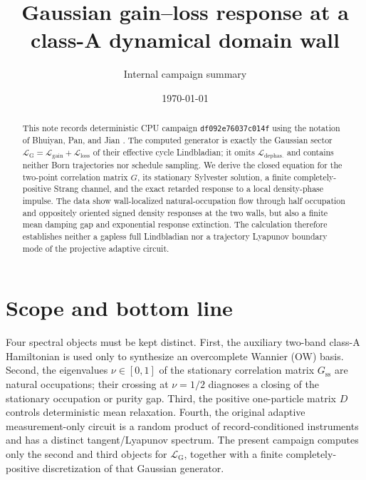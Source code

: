 \documentclass[aps,prb,twocolumn,nofootinbib,superscriptaddress,floatfix]{revtex4-2}
\newcommand{\Gss}{G_{\mathrm{ss}}}
\begin{document}
\title{Gaussian gain--loss response at a class-A dynamical domain wall}
\author{Internal campaign summary}
\date{\today}

\begin{abstract}
This note records deterministic CPU campaign \texttt{df092e76037c014f} using
the notation of Bhuiyan, Pan, and Jian \cite{Bhuiyan2026}. The computed
generator is exactly the Gaussian sector
$\mathcal L_{\mathrm G}=\mathcal L_{\mathrm{gain}}+
\mathcal L_{\mathrm{loss}}$ of their effective cycle Lindbladian; it omits
$\mathcal L_{\mathrm{dephas.}}$ and contains neither Born trajectories nor
schedule sampling. We derive the closed equation for the two-point correlation
matrix $G$, its stationary Sylvester solution, a finite completely-positive
Strang channel, and the exact retarded response to a local density-phase
impulse. The data show wall-localized natural-occupation flow through half
occupation and oppositely oriented signed density responses at the two walls,
but also a finite mean damping gap and exponential response extinction. The
calculation therefore establishes neither a gapless full Lindbladian nor a
trajectory Lyapunov boundary mode of the projective adaptive circuit.
\end{abstract}

\maketitle
\setcounter{tocdepth}{2}
\tableofcontents

\section{Scope and bottom line}

Four spectral objects must be kept distinct. First, the auxiliary two-band
class-A Hamiltonian is used only to synthesize an overcomplete Wannier (OW)
basis. Second, the eigenvalues $\nu\in[0,1]$ of the stationary correlation
matrix $\Gss$ are natural occupations; their crossing at $\nu=1/2$
diagnoses a closing of the stationary occupation or purity gap. Third, the
positive one-particle matrix $D$ controls deterministic mean relaxation.
Fourth, the original adaptive measurement-only circuit is a random product of
record-conditioned instruments and has a distinct tangent/Lyapunov spectrum.
The present campaign computes only the second and third objects for
$\mathcal L_{\mathrm G}$, together with a finite completely-positive
discretization of that Gaussian generator.
\end{document}
